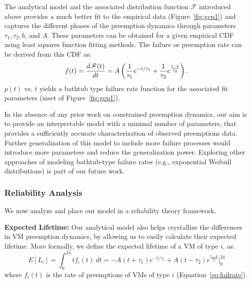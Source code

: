 The analytical model and the associated  distribution function $\mathscr{F}$ introduced above provides a much better fit to the empirical data (Figure~\ref{fig:gcp1}) and captures the different phases of the preemption dynamics through parameters $\tau_1, \tau_2, b$, and $A$. These parameters can be obtained for a given empirical CDF using least squares function fitting methods. The failure or preemption rate can be derived from this CDF as:
\begin{equation}
  \label{eq:failrate}
    \vspace*{\eqnspace}
f(t) = \dfrac{d \mathscr{F}(t)} {dt} = A \left(\dfrac{1}{\tau_1}e^{-t/\tau_1} + \dfrac{1}{\tau_2}e^{\frac{t-b}{\tau_2}}\right).
\end{equation}
$p(t)$ vs. $t$ yields a bathtub type failure rate function for the associated fit parameters (inset of Figure~\ref{fig:gcp1}).


In the absence of any prior work on constrained preemption dynamics, our aim is to provide an interpretable model with a minimal number of parameters, that provides a sufficiently accurate characterization of observed preemptions data. 
Further generalization of this model to include more failure processes would introduce more parameters and reduce the generalization power.
Exploring other approaches of modeling bathtub-type failure rates (e.g., exponential Weibull distributions) \cite{mudholkar1993exponentiated,crevecoeur1993model} is part of our future work. 


\subsubsection{Reliability Analysis}


We now analyze and place our model in a reliability theory framework. 
%

\noindent \textbf{Expected Lifetime:} Our analytical model also helps crystallize the differences in VM preemption dynamics, by allowing us to easily calculate their expected lifetime. 
More formally, we define the expected lifetime of a VM of type $i$, as: 
\begin{equation}
  \label{eq:expected-lifetime}
E[L_i] =  \int_{0}^{24} t {f_i}(t)~dt =  -A(t+\tau_1)e^{-t/\tau_1} + A(t-\tau_2) e^{\frac{t-b}{\tau_2}} \biggr\rvert_{0}^{24}
\end{equation}
where $f_i(t)$ is the rate of preemptions of VMs of type $i$ (Equation~\ref{eq:failrate}).
%

